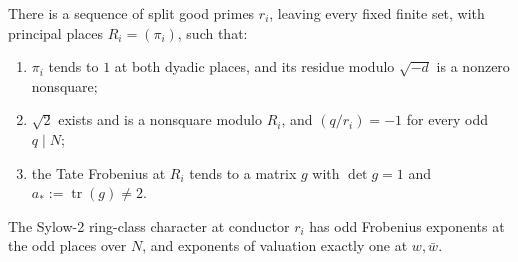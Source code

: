 \begin{lemma}
\label{split-measures:auxiliary-primes}
There is a sequence of split good primes \(r_i\), leaving every fixed finite
set, with principal places \(R_i=(\pi_i)\), such that:
\begin{enumerate}[label=\textup{(\roman*)}]
\item \(\pi_i\) tends to \(1\) at both dyadic places, and its residue modulo
\(\sqrt{-d}\) is a nonzero nonsquare;
\item \(\sqrt2\) exists and is a nonsquare modulo \(R_i\), and
\((q/r_i)=-1\) for every odd \(q\mid N\);
\item the Tate Frobenius at \(R_i\) tends to a matrix \(g\) with
\(\det g=1\) and \(a_*:=\operatorname{tr}(g)\ne2\).
\end{enumerate}
The Sylow-2 ring-class character at conductor \(r_i\) has odd Frobenius
exponents at the odd places over \(N\), and exponents of valuation exactly
one at \(w,\bar w\).
\end{lemma}

